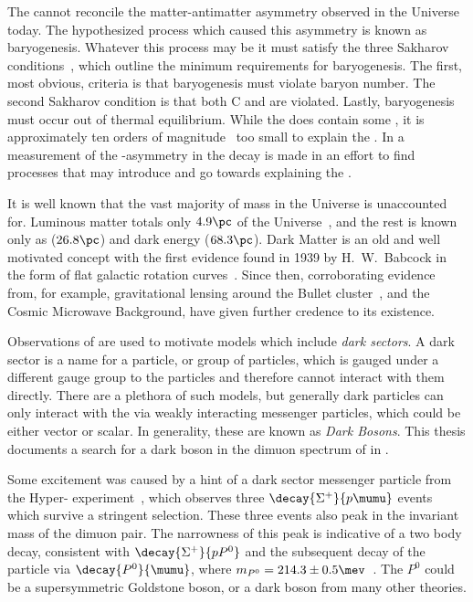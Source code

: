 The \sm cannot reconcile the matter-antimatter asymmetry observed in the
Universe today.
The hypothesized process which caused this asymmetry is known as baryogenesis.
Whatever this process may be it must satisfy the three Sakharov
conditions~\cite{1991SvPhU..34..392S}, which outline the minimum requirements for baryogenesis.
The first, most obvious, criteria is that baryogenesis must violate baryon number.
The second Sakharov condition is that both \gls{C} and \CP are violated.
Lastly, baryogenesis must occur out of thermal equilibrium.
While the \sm does contain  some \CPV, it is approximately ten orders of
magnitude~\cite{Cline:2006ts,Huet:1994jb} too small to explain the \BAU.
In  a measurement of the \CP-asymmetry in the decay \btodsphi is made in an effort
to find \np processes that may introduce \CPV and go towards explaining the \BAU.


It is well known that the vast majority of mass in the Universe is unaccounted for.
Luminous matter totals only \approx$4.9\pc$ of the Universe~\cite{Adam:2015rua,PDG2014}, and the rest
is known only as \dm (\approx$26.8\pc$) and dark energy (\approx$68.3\pc$).
Dark Matter is an old and well motivated concept with the first evidence found in 1939 by H.~W.~Babcock
in the form of flat galactic rotation curves~\cite{1970ApJ...159..379R,1980ApJ...238..471R}.
Since then, corroborating evidence from, for example, gravitational lensing around the Bullet
cluster~\cite{Markevitch:2003at}, and the Cosmic Microwave Background, have given further credence
to its existence.


Observations of \dm are used to motivate \np models which include \emph{dark sectors}.
A dark sector is a name for a particle, or group of particles, which is gauged under a
different gauge group to the \sm particles and therefore cannot interact with them directly.
There are a plethora of such models, but generally dark particles can only interact with the \sm
via weakly interacting messenger particles, which could be either vector or scalar.
In generality, these are known as \emph{Dark Bosons}.
This thesis documents a search for a dark boson in the dimuon spectrum of \btokstrmumu in
.

Some excitement was caused by a hint of a dark sector messenger particle from the Hyper-\CP
experiment~\cite{Burnstein:2004uk}, which observes three $\decay{\Sigma^+}{p\mumu}$ events which
survive a stringent selection.
These three events also peak in the invariant mass of the dimuon pair.
The narrowness of this peak is indicative of a two body decay, consistent with
$\decay{\Sigma^+}{pP^0}$ and the subsequent decay of the \np particle via $\decay{P^0}{\mumu}$,
where $m_{P^0}=214.3\pm0.5\mev$~\cite{Park:2005eka}.
The $P^0$ could be a supersymmetric Goldstone boson, or a dark boson from many other theories.



